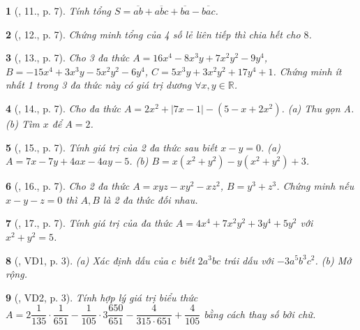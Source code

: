 \documentclass{article}
\newtheorem{baitoan}{}
\begin{document}
\begin{baitoan}[\cite{Tuyen_Toan_8}, 11., p. 7]
	Tính tổng $S = \overline{ab} + \overline{abc} + \overline{ba} -\overline{bac}$.
\end{baitoan}

\begin{baitoan}[\cite{Tuyen_Toan_8}, 12., p. 7]
	Chứng minh tổng của 4 số lẻ liên tiếp thì chia hết cho $8$.
\end{baitoan}

\begin{baitoan}[\cite{Tuyen_Toan_8}, 13., p. 7]
	Cho 3 đa thức $A = 16x^4 - 8x^3y + 7x^2y^2 - 9y^4$, $B = -15x^4 + 3x^3y - 5x^2y^2 - 6y^4$, $C = 5x^3y + 3x^2y^2 + 17y^4 + 1$. Chứng minh ít nhất 1 trong 3 đa thức này có giá trị dương $\forall x,y\in\mathbb{R}$.
\end{baitoan}

\begin{baitoan}[\cite{Tuyen_Toan_8}, 14., p. 7]
	Cho đa thức $A = 2x^2 + |7x - 1| - (5 - x + 2x^2)$. (a) Thu gọn A. (b) Tìm $x$ để $A = 2$.
\end{baitoan}

\begin{baitoan}[\cite{Tuyen_Toan_8}, 15., p. 7]
	Tính giá trị của 2 đa thức sau biết $x - y = 0$. (a) $A = 7x - 7y + 4ax - 4ay - 5$. (b) $B = x(x^2 + y^2) - y(x^2 + y^2) + 3$.
\end{baitoan}

\begin{baitoan}[\cite{Tuyen_Toan_8}, 16., p. 7]
	Cho 2 đa thức $A = xyz - xy^2 - xz^2$, $B = y^3 + z^3$. Chứng minh nếu $x - y - z = 0$ thì $A,B$ là 2 đa thức đối nhau.
\end{baitoan}

\begin{baitoan}[\cite{Tuyen_Toan_8}, 17., p. 7]
	Tính giá trị của đa thức $A = 4x^4 + 7x^2y^2 + 3y^4 + 5y^2$ với $x^2 + y^2 = 5$.
\end{baitoan}

\begin{baitoan}[\cite{Binh_Toan_8_tap_1}, VD1, p. 3]
	(a) Xác định dấu của $c$ biết $2a^3bc$ trái dấu với $-3a^5b^3c^2$. (b) Mở rộng.
\end{baitoan}

\begin{baitoan}[\cite{Binh_Toan_8_tap_1}, VD2, p. 3]
	Tính hợp lý giá trị biểu thức $A = 2\dfrac{1}{135}\cdot\dfrac{1}{651} - \dfrac{1}{105}\cdot3\dfrac{650}{651} - \dfrac{4}{315\cdot651} + \dfrac{4}{105}$ bằng cách thay số bởi chữ.
\end{baitoan}
\end{document}
